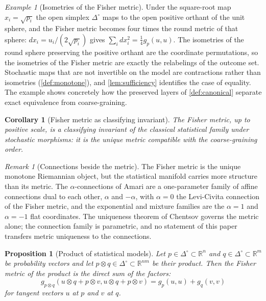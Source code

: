 \documentclass[11pt,letterpaper]{article}
\newtheorem{proposition}[theorem]{Proposition}
\newtheorem{corollary}[theorem]{Corollary}
\theoremstyle{definition}
\theoremstyle{remark}
\newtheorem{remark}[theorem]{Remark}
\newtheorem{example}[theorem]{Example}
\begin{document}
\begin{example}[Isometries of the Fisher metric]
\label{ex:reparameterization}
Under the square-root map $x_i = \sqrt{p_i}$ the open simplex $\Delta^{\circ}$ maps to the open positive orthant of the unit sphere, and the Fisher metric becomes four times the round metric of that sphere: $dx_i = u_i / (2 \sqrt{p_i})$ gives $\sum_i dx_i^{2} = \tfrac{1}{4} g_{p}(u, u)$. The isometries of the round sphere preserving the positive orthant are the coordinate permutations, so the isometries of the Fisher metric are exactly the relabelings of the outcome set. Stochastic maps that are not invertible on the model are contractions rather than isometries (\cref{def:monotone}), and \cref{lem:sufficiency} identifies the case of equality. The example shows concretely how the preserved layers of \cref{def:canonical} separate exact equivalence from coarse-graining.
\end{example}

\begin{corollary}[Fisher metric as classifying invariant]
\label{cor:fisher-invariant}
The Fisher metric, up to positive scale, is a classifying invariant of the classical statistical family under stochastic morphisms: it is the unique metric compatible with the coarse-graining order.
\end{corollary}

\begin{remark}[Connections beside the metric]
\label{rem:connections}
The Fisher metric is the unique monotone Riemannian object, but the statistical manifold carries more structure than its metric. The $\alpha$-connections of Amari \cite{amari} are a one-parameter family of affine connections dual to each other, $\alpha$ and $-\alpha$, with $\alpha = 0$ the Levi-Civita connection of the Fisher metric, and the exponential and mixture families are the $\alpha = 1$ and $\alpha = -1$ flat coordinates. The uniqueness theorem of Chentsov governs the metric alone; the connection family is parametric, and no statement of this paper transfers metric uniqueness to the connections.
\end{remark}

\begin{proposition}[Product of statistical models]
\label{prop:stat-product}
Let $p \in \Delta^{\circ} \subset \mathbb{R}^{n}$ and $q \in \Delta^{\circ} \subset \mathbb{R}^{m}$ be probability vectors and let $p \otimes q \in \Delta^{\circ} \subset \mathbb{R}^{nm}$ be their product. Then the Fisher metric of the product is the direct sum of the factors:
\[
g_{p \otimes q}(u \otimes q + p \otimes v, u \otimes q + p \otimes v) = g_{p}(u, u) + g_{q}(v, v)
\]
for tangent vectors $u$ at $p$ and $v$ at $q$.
\end{proposition}
\end{document}
